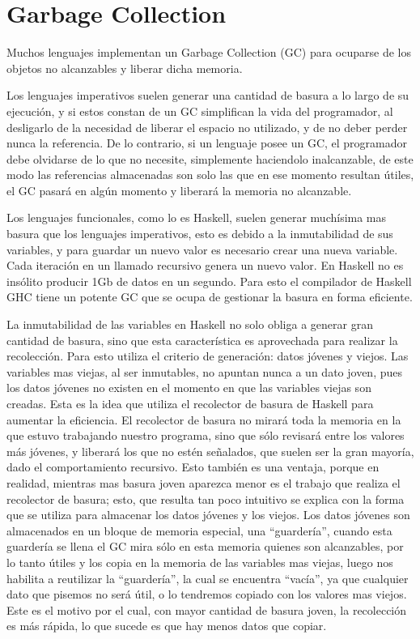 
\section{Garbage Collection} %
\label{sec:garbage_collection}

Muchos lenguajes implementan un Garbage Collection (GC) para ocuparse de los objetos no alcanzables y liberar dicha memoria.


Los lenguajes imperativos suelen generar una cantidad de basura a lo largo de su ejecución, y si estos constan de un GC simplifican la vida del programador, al desligarlo de la necesidad de liberar el espacio no utilizado, y de no deber perder nunca la referencia. De lo contrario, si un lenguaje posee un GC, el programador debe olvidarse de lo que no necesite, simplemente haciendolo inalcanzable, de este modo las referencias almacenadas son solo las que en ese momento resultan útiles, el GC pasará en algún momento y liberará la memoria no alcanzable.


Los lenguajes funcionales, como lo es Haskell, suelen generar muchísima mas basura que los lenguajes imperativos, esto es debido a la inmutabilidad de sus variables, y para guardar un nuevo valor es necesario crear una nueva variable. Cada iteración en un llamado recursivo genera un nuevo valor. En Haskell no es insólito producir 1Gb de datos en un segundo.
Para esto el compilador de Haskell GHC tiene un potente GC que se ocupa de gestionar la basura en forma eficiente.


La inmutabilidad de las variables en Haskell no solo obliga a generar gran cantidad de basura, sino que esta característica es aprovechada para realizar la recolección.
Para esto utiliza el criterio de generación: datos jóvenes y viejos. Las variables mas viejas, al ser inmutables, no apuntan nunca a un dato joven, pues los datos jóvenes no existen en el momento en que las variables viejas son creadas. Esta es la idea que utiliza el recolector de basura de Haskell para aumentar la eficiencia.
El recolector de basura no mirará toda la memoria en la que estuvo trabajando nuestro programa, sino que sólo revisará entre los valores más jóvenes, y liberará los que no estén señalados, que suelen ser la gran mayoría, dado el comportamiento recursivo. Esto también es una ventaja, porque en realidad, mientras mas basura joven aparezca menor es el trabajo que realiza el recolector de basura; esto, que resulta tan poco intuitivo se explica con la forma que se utiliza para almacenar los datos jóvenes y los viejos.
Los datos jóvenes son almacenados en un bloque de memoria especial, una “guardería”, cuando esta guardería se llena el GC mira sólo en esta memoria quienes son alcanzables, por lo tanto útiles y los copia en la memoria de las variables mas viejas, luego nos habilita a reutilizar la “guardería”, la cual se encuentra “vacía”, ya que cualquier dato que pisemos no será útil, o lo tendremos copiado con los valores mas viejos. Este es el motivo por el cual, con mayor cantidad de basura joven, la recolección es más rápida, lo que sucede es que hay menos datos que copiar.

